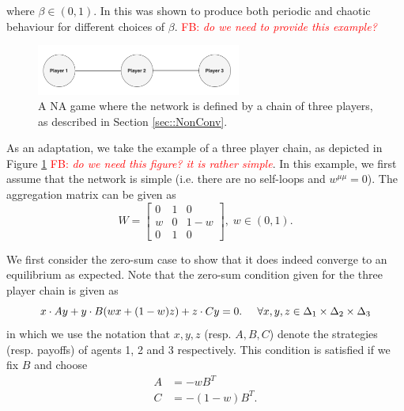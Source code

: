 \documentclass{article}
\theoremstyle{definition}
\newcommand{\fb}[1]{\textcolor{red}{FB: \textit{#1}}}
\begin{document}
  where $\beta \in (0, 1)$. In \cite{VanStrien2011} this was shown to produce both periodic and chaotic behaviour for different choices of $\beta$. \fb{do we need to provide this example?} 

  \begin{figure}[t]
    \centering
    \includegraphics[width = 0.6\textwidth]{Figures/ThreePlayerNetwork.png}
    \caption{\label{fig::ThreePlayerNetwork} A NA game where the network is defined by a chain of
    three players, as described in Section \ref{sec::NonConv}.}
  \end{figure}

  As an adaptation, we take the example of a three player chain, as
  depicted in Figure \ref{fig::ThreePlayerNetwork} \fb{do we need this
    figure? it is rather simple}. In this example, we first assume
  that the network is simple (i.e. there are no self-loops and $w^{\mu
    \mu} = 0$). The aggregation matrix can be given as
%
  \begin{equation}
    W = \begin{bmatrix}
      0 & 1 & 0 \\
      w & 0 & 1 - w \\
      0 & 1 & 0
    \end{bmatrix}, \; w \in (0, 1).
  \end{equation}


  We first consider the zero-sum case to show that it does indeed converge to an equilibrium as expected. Note that the zero-sum condition given for the three player chain is given as
%
  \begin{equation}
    x \cdot A y + y \cdot B (w x + (1-w)z) + z \cdot C y = 0. \hspace{0.5cm} \forall x, y, z \in \Delta_1 \times \Delta_2 \times \Delta_3
  \end{equation}
  in which we use the notation that $x, y, z$ (resp. $A, B, C$) denote the strategies (resp. payoffs) of agents 1, 2 and 3 respectively. This condition is satisfied if we fix $B$ and choose
%
  \begin{align} \label{eq::zeroSumShapley}
    A & = - w B^T \nonumber \\
    C & = - (1 - w) B^T. 
  \end{align}
\end{document}

